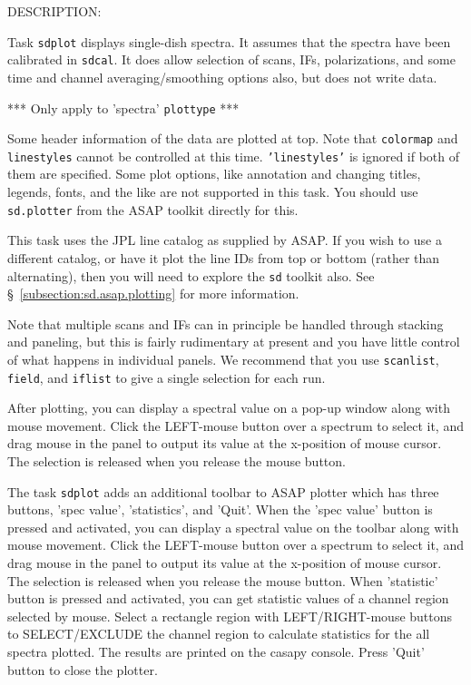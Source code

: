     DESCRIPTION:
    
    Task {\tt sdplot} displays single-dish spectra.  
    It assumes that the spectra have been calibrated in {\tt sdcal}.
    It does allow selection of scans, IFs, polarizations, and
    some time and channel averaging/smoothing options also,
    but does not write data.
    
    *** Only apply to 'spectra' {\tt plottype} ***

    Some header information of the data are plotted at top.
    Note that {\tt colormap} and {\tt linestyles} cannot be controlled at this time.
    {\tt 'linestyles'} is ignored if both of them are specified.
    Some plot options, like annotation and changing titles,
    legends, fonts, and the like are not supported in this task.
    You should use {\tt sd.plotter} from the ASAP toolkit directly for this.

    This task uses the JPL line catalog as supplied by ASAP.
    If you wish to use a different catalog, or have it plot
    the line IDs from top or bottom (rather than alternating),
    then you will need to explore the {\tt sd} toolkit also.
    See \S~\ref{subsection:sd.asap.plotting} for more information.
    
    Note that multiple scans and IFs can in principle be handled
    through stacking and paneling, but this is fairly rudimentary
    at present and you have little control of what happens in
    individual panels.  We recommend that you use {\tt scanlist}, 
    {\tt field}, and {\tt iflist} to give a single selection for each run.

    After plotting, you can display a spectral value on a pop-up
    window along with mouse movement. Click the LEFT-mouse button
    over a spectrum to select it, and drag mouse in the panel to
    output its value at the x-position of mouse cursor. The selection
    is released when you release the mouse button.

    The task {\tt sdplot} adds an additional toolbar to ASAP plotter which
    has three buttons, 'spec value', 'statistics', and 'Quit'. 
    When the 'spec value' button is pressed and activated, you can 
    display a spectral value on the toolbar along with mouse
    movement. Click the LEFT-mouse button over a spectrum to select
    it, and drag mouse in the panel to output its value at the 
    x-position of mouse cursor. The selection is released when you
    release the mouse button. 
    When 'statistic' button is pressed and activated, you can get
    statistic values of a channel region selected by mouse. Select a
    rectangle region with LEFT/RIGHT-mouse buttons to SELECT/EXCLUDE the
    channel region to calculate statistics for the all spectra
    plotted. The results are printed on the casapy console. 
    Press 'Quit' button to close the plotter.
    
